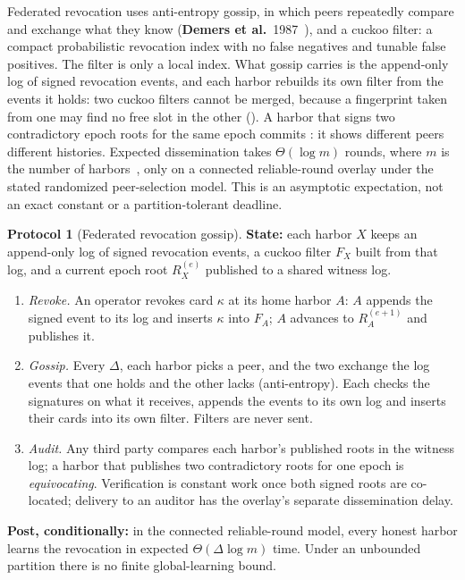 \documentclass[11pt,a4paper]{article}
\theoremstyle{definition}
\theoremstyle{definition}
\newtheorem{protocol}{Protocol}[section]
\theoremstyle{remark}
\begin{document}
Federated revocation uses anti-entropy gossip, in which peers repeatedly
compare and exchange what they know
(\textbf{Demers et al.}~1987~), and a cuckoo filter: a compact
probabilistic revocation index with no false negatives and tunable false positives.
The filter is only a local index. What gossip carries is the append-only log
of signed revocation events, and each harbor rebuilds its own filter from the
events it holds: two cuckoo filters cannot be merged, because a fingerprint
taken from one may find no free slot in the other
().
A harbor that signs two contradictory epoch roots for the same epoch commits
: it shows different peers different histories.
Expected dissemination takes $\Theta(\log m)$ rounds, where $m$ is the number
of harbors~, only on a connected
reliable-round overlay under the stated randomized peer-selection model.
This is an asymptotic expectation, not an exact constant or a partition-tolerant deadline.

\begin{protocol}[Federated revocation gossip]\label{prot:gossip}
\textbf{State:} each harbor $X$ keeps an append-only log of signed revocation
events, a cuckoo filter $F_X$ built from that log, and a current epoch
root $R_X^{(e)}$ published to a shared witness log.
\begin{enumerate}[leftmargin=2.0em,itemsep=1pt,topsep=2pt]
  \item \emph{Revoke.} An operator revokes card $\kappa$ at its home harbor $A$:
    $A$ appends the signed event to its log and inserts $\kappa$ into $F_A$; $A$
    advances to $R_A^{(e+1)}$ and publishes it.
  \item \emph{Gossip.} Every $\Delta$, each harbor picks a peer, and the two
    exchange the log events that one holds and the other lacks (anti-entropy).
    Each checks the signatures on what it receives, appends the events to its own
    log and inserts their cards into its own filter. Filters are never sent.
  \item \emph{Audit.} Any third party compares each harbor's published roots in the
    witness log; a harbor that publishes two contradictory roots for one epoch is
    \emph{equivocating}. Verification is constant work once both signed roots are
    co-located; delivery to an auditor has the overlay's separate dissemination delay.
\end{enumerate}
{\relax
\textbf{Post, conditionally:} in the connected reliable-round model, every honest
harbor learns the revocation in expected $\Theta(\Delta\log m)$ time. Under an
unbounded partition there is no finite global-learning bound.
\par}
\end{protocol}
\end{document}
